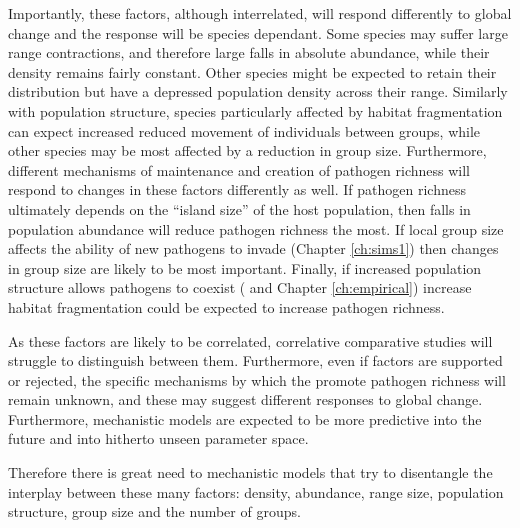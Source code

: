 

Importantly, these factors, although interrelated, will respond differently to global change and the response will be species dependant.
Some species may suffer large range contractions, and therefore large falls in absolute abundance, while their density remains fairly constant.
Other species might be expected to retain their distribution but have a depressed population density across their range.
Similarly with population structure, species particularly affected by habitat fragmentation can expect increased reduced movement of individuals between groups, while other species may be most affected by a reduction in group size.
Furthermore, different mechanisms of maintenance and creation of pathogen richness will respond to changes in these factors differently as well.
If pathogen richness ultimately depends on the ``island size'' of the host population, then falls in population abundance will reduce pathogen richness the most.
If local group size affects the ability of new pathogens to invade (Chapter \ref{ch:sims1}) then changes in group size are likely to be most important.
Finally, if increased population structure allows pathogens to coexist (\parencite{qiu2013vector, allen2004sis, nunes2006localized} and Chapter \ref{ch:empirical}) increase habitat fragmentation could be expected to increase pathogen richness.

As these factors are likely to be correlated, correlative comparative studies will struggle to distinguish between them.
Furthermore, even if factors are supported or rejected, the specific mechanisms by which the promote pathogen richness will remain unknown, and these may suggest different responses to global change.
Furthermore, mechanistic models are expected to be more predictive into the future and into hitherto unseen parameter space.





Therefore there is great need to mechanistic models that try to disentangle the interplay between these many factors: density, abundance, range size, population structure, group size and the number of groups.











